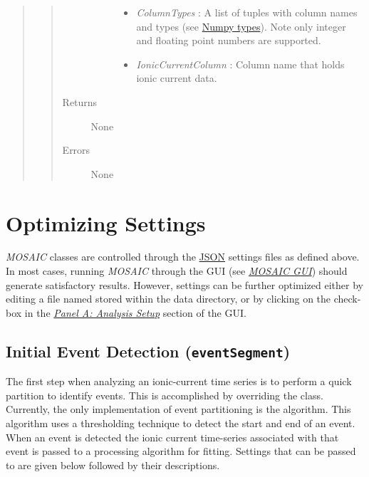 \documentclass[letterpaper,10pt,english]{sphinxmanual}
\begin{document}
\begin{quote}
\begin{quote}
\begin{description}
\begin{description}
\begin{itemize}
\item {} 
\emph{ColumnTypes} :       A list of tuples with column names and types (see \href{http://docs.scipy.org/doc/numpy/user/basics.types.html}{Numpy types}). Note only integer and floating point numbers are supported.

\item {} 
\emph{IonicCurrentColumn} : Column name that holds ionic current data.

\end{itemize}

\end{description}

\item[{Returns}] \leavevmode
None

\item[{Errors}] \leavevmode
None

\end{description}\end{quote}
\end{quote}


\section{Optimizing Settings}
\label{doc/settingsFile:algorithm-settings-sec}\label{doc/settingsFile:optimizing-settings}
\emph{MOSAIC} classes are controlled through the \href{http://json.org/}{JSON} settings files as defined above. In most cases, running \emph{MOSAIC} through the GUI (see {\hyperref[doc/GraphicalInterface:gui\string-page]{\emph{MOSAIC GUI}}}) should generate satisfactory results. However, settings can be further optimized either by editing a file named  stored within the data directory, or by clicking on the  check-box in the {\hyperref[doc/GraphicalInterface:analysis\string-setup]{\emph{Panel A: Analysis Setup}}} section of the GUI.


\subsection{Initial Event Detection (\texttt{eventSegment})}
\label{doc/settingsFile:initial-event-detection-eventsegment}\label{doc/settingsFile:eventseg-settings-sec}
The first step when analyzing an ionic-current time series is to perform a quick partition to identify events. This is accomplished by overriding the  class. Currently, the only implementation of event partitioning is the  algorithm. This algorithm uses a thresholding technique to detect the start and end of an event. When an event is detected the ionic current time-series associated with that event is passed to a processing algorithm for fitting. Settings that can be passed to  are given below followed by their descriptions.
\end{document}

